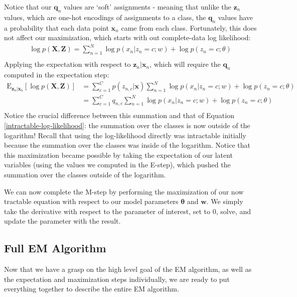 Notice that our $\textbf{q}_n$ values are `soft' assignments - meaning that unlike the $\textbf{z}_n$ values, which are one-hot encodings of assignments to a class, the $\textbf{q}_n$ values have a probability that each data point $\textbf{x}_n$ came from each class. Fortunately, this does not affect our maximization, which starts with out complete-data log likelihood:
\begin{align*}
    \log p(\textbf{X}, \textbf{Z}) = \sum_{n=1}^{N} \log p(x_n | z_n = c; w) + \log p(z_n = c; \theta) \\
\end{align*}
Applying the expectation with respect to $\textbf{z}_n | \textbf{x}_n$, which will require the $\textbf{q}_n$ computed in the expectation step:
\begin{align*}
    \mathrm{E}_{\textbf{z}_n | \textbf{x}_n} [\log p(\textbf{X}, \textbf{Z})] &= \sum_{c=1}^{C} p(z_{n, c} | \textbf{x}) \sum_{n=1}^{N} \log p(x_n | z_n = c; w) + \log p(z_n = c; \theta) \\
    &= \sum_{c=1}^{C} q_{n, c} \sum_{n=1}^{N} \log p(x_n | z_n = c; w) + \log p(z_n = c; \theta) \\
\end{align*}
Notice the crucial difference between this summation and that of Equation \ref{intractable-log-likelihood}: the summation over the classes is now outside of the logarithm! Recall that using the log-likelihood directly was intractable initially because the summation over the classes was inside of the logarithm. Notice that this maximization became possible by taking the expectation of our latent variables (using the values we computed in the E-step), which pushed the summation over the classes outside of the logarithm.

We can now complete the M-step by performing the maximization of our now tractable equation with respect to our model parameters $\boldsymbol{\theta}$ and $\textbf{w}$. We simply take the derivative with respect to the parameter of interest, set to 0, solve, and update the parameter with the result.

\subsection{Full EM Algorithm}
Now that we have a grasp on the high level goal of the EM algorithm, as well as the expectation and maximization steps individually, we are ready to put everything together to describe the entire EM algorithm.

